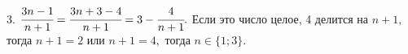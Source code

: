 3. $\cfrac{3n-1}{n+1}=\cfrac{3n+3-4}{n+1}=3-\cfrac{4}{n+1}.$ Если это число целое, 4 делится на $n+1,$ тогда $n+1=2$ или $n+1=4,$
тогда $n\in\{1; 3\}.$\\
